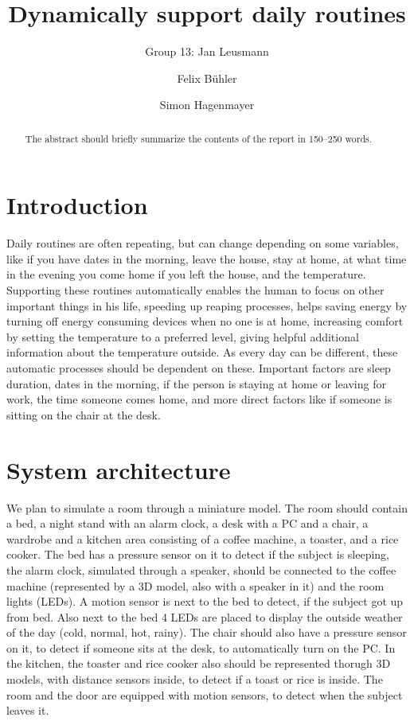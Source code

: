\documentclass[runningheads]{llncs}
\begin{document}
%
\title{Dynamically support daily routines}

\author{Group 13: Jan Leusmann\and
Felix Bühler \and
Simon Hagenmayer}

%
\maketitle              %
%
\begin{abstract}
The abstract should briefly summarize the contents of the report in
150--250 words.

\end{abstract}
%
%
%
\section{Introduction}
Daily routines are often repeating, but can change depending on some variables, like if you have dates in the morning, leave the house, stay at home, at what time in the evening you come home if you left the house, and the temperature. 
Supporting these routines automatically enables the human to focus on other important things in his life, speeding up reaping processes, helps saving energy by turning off energy consuming devices when no one is at home, increasing comfort by setting the temperature to a preferred level, giving helpful additional information about the temperature outside.
As every day can be different, these automatic processes should be dependent on these. 
Important factors are sleep duration, dates in the morning, if the person is staying at home or leaving for work, the time someone comes home, and more direct factors like if someone is sitting on the chair at the desk.




\section{System architecture}
We plan to simulate a room through a miniature model.
The room should contain a bed, a night stand with an alarm clock, a desk with a PC and a chair, a wardrobe and a kitchen area consisting of a coffee machine, a toaster, and a rice cooker.
The bed has a pressure sensor on it to detect if the subject is sleeping, the alarm clock, simulated through a speaker, should be connected to the coffee machine (represented by a 3D model, also with a speaker in it) and the room lights (LEDs).
A motion sensor is next to the bed to detect, if the subject got up from bed.
Also next to the bed 4 LEDs are placed to display the outside weather of the day (cold, normal, hot, rainy). 
The chair should also have a pressure sensor on it, to detect if someone sits at the desk, to automatically turn on the PC.
In the kitchen, the toaster and rice cooker also should be represented thorugh 3D models, with distance sensors inside, to detect if a toast or rice is inside. 
The room and the door are equipped with motion sensors, to detect when the subject leaves it.
\end{document}
